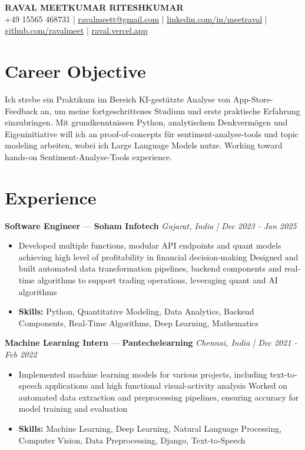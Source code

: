 \documentclass[a4paper,10pt]{article}
\begin{document}
\begin{center}
  {\Large\bfseries RAVAL MEETKUMAR RITESHKUMAR}\\[2pt]
  {\small +49 15565 468731 \;|\; \href{mailto:ravalmeett@gmail.com}{ravalmeett@gmail.com} \;|\; \href{https://www.linkedin.com/in/meetraval/}{linkedin.com/in/meetraval} \;|\; \href{https://github.com/ravalmeet}{github.com/ravalmeet} \;|\; \href{https://raval.vercel.app/}{raval.vercel.app}}
\end{center}
\vspace{-3pt}

\section*{Career Objective}
Ich strebe ein Praktikum im Bereich KI-gestützte Analyse von App-Store-Feedback an, um meine fortgeschrittenes Studium und erste praktische Erfahrung einzubringen. Mit grundkenntnissen Python, analytischem Denkvermögen und Eigeninitiative will ich an proof-of-concepts für sentiment-analyse-tools und topic modeling arbeiten, wobei ich Large Language Models nutze. Working toward hands-on Sentiment-Analyse-Tools experience.\par

\section*{Experience}
\textbf{Software Engineer} — \textbf{Soham Infotech} \hfill \textit{Gujarat, India \;|\; Dec 2023 - Jan 2025}\par
\vspace{1pt}
\begin{itemize}
  \item Developed multiple functions, modular API endpoints and quant models achieving high level of profitability in financial decision-making Designed and built automated data transformation pipelines, backend components and real-time algorithms to support trading operations, leveraging quant and AI algorithms
  \item \textbf{Skills:} Python, Quantitative Modeling, Data Analytics, Backend Components, Real-Time Algorithms, Deep Learning, Mathematics
\end{itemize}
\vspace{3pt}
\textbf{Machine Learning Intern} — \textbf{Pantechelearning} \hfill \textit{Chennai, India \;|\; Dec 2021 - Feb 2022}\par
\vspace{1pt}
\begin{itemize}
  \item Implemented machine learning models for various projects, including text-to-speech applications and high functional visual-activity analysis Worked on automated data extraction and preprocessing pipelines, ensuring accuracy for model training and evaluation
  \item \textbf{Skills:} Machine Learning, Deep Learning, Natural Language Processing, Computer Vision, Data Preprocessing, Django, Text-to-Speech
\end{itemize}
\end{document}
